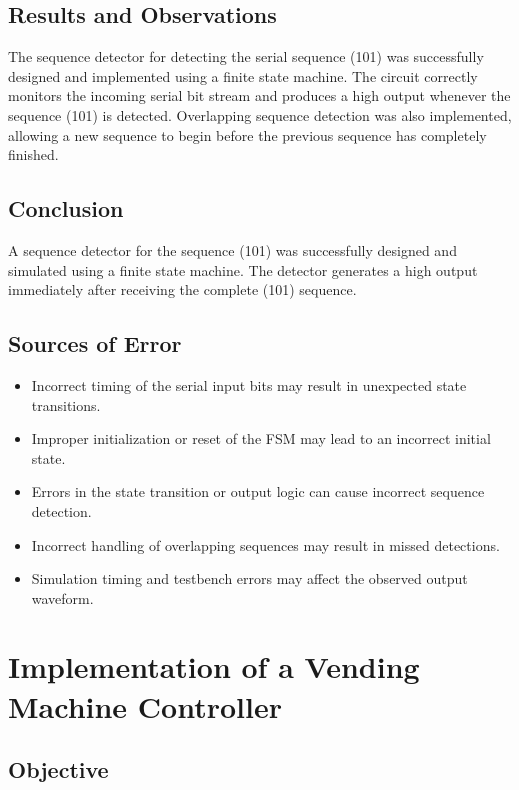 \documentclass[12pt,a4paper]{report}
\begin{document}
\section{Results and Observations}

The sequence detector for detecting the serial sequence (101) was successfully designed and implemented using a finite state machine. The circuit correctly monitors the incoming serial bit stream and produces a high output whenever the sequence (101) is detected. Overlapping sequence detection was also implemented, allowing a new sequence to begin before the previous sequence has completely finished.

\section{Conclusion}

A sequence detector for the sequence (101) was successfully designed and simulated using a finite state machine. The detector generates a high output immediately after receiving the complete (101) sequence. 


\section{Sources of Error}

\begin{itemize}
\item Incorrect timing of the serial input bits may result in unexpected state transitions.
\item Improper initialization or reset of the FSM may lead to an incorrect initial state.
\item Errors in the state transition or output logic can cause incorrect sequence detection.
\item Incorrect handling of overlapping sequences may result in missed detections.
\item Simulation timing and testbench errors may affect the observed output waveform.
\end{itemize}

\vspace{2.5cm}


\chapter{Implementation of a Vending Machine Controller}
\label{ch:pdf22}

\section{Objective}
\end{document}

